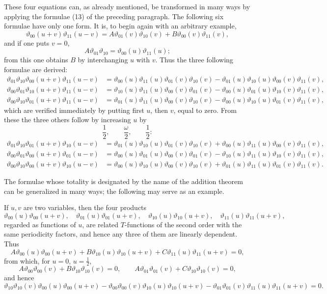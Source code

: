 \documentclass[11pt]{article}
\newcommand{\tht}{\vartheta}
\begin{document}
These four equations can, as already mentioned, be transformed in many ways by applying the formulae (13) of the preceding paragraph. The following six formulae have only one form. It is, to begin again with an arbitrary example,
\[
\tht_{00}(u+v)\tht_{11}(u-v)=A\tht_{01}(v)\tht_{10}(v)+B\tht_{00}(v)\tht_{11}(v),
\]
and if one puts $v=0$,
\[
A\tht_{01}\tht_{10}=\tht_{00}(u)\tht_{11}(u);
\]
from this one obtains $B$ by interchanging $u$ with $v$. Thus the three following formulae are derived:
\begin{align}
\tht_{01}\tht_{10}\tht_{00}(u+v)\tht_{11}(u-v)
&=\tht_{00}(u)\tht_{11}(u)\tht_{01}(v)\tht_{10}(v)
 -\tht_{01}(u)\tht_{10}(u)\tht_{00}(v)\tht_{11}(v), \tag{5}\\
\tht_{00}\tht_{01}\tht_{10}(u+v)\tht_{11}(u-v)
&=\tht_{10}(u)\tht_{11}(u)\tht_{00}(v)\tht_{01}(v)
 -\tht_{00}(u)\tht_{01}(u)\tht_{10}(v)\tht_{11}(v), \tag{6}\\
\tht_{00}\tht_{10}\tht_{01}(u+v)\tht_{11}(u-v)
&=\tht_{01}(u)\tht_{11}(u)\tht_{00}(v)\tht_{10}(v)
 -\tht_{00}(u)\tht_{10}(u)\tht_{01}(v)\tht_{11}(v), \tag{7}
\end{align}
which are verified immediately by putting first $u$, then $v$, equal to zero. From these the three others follow by increasing $u$ by
\[
\frac12,\qquad \frac{\omega}{2},\qquad \frac12:
\]
\begin{align}
\tht_{01}\tht_{10}\tht_{01}(u+v)\tht_{10}(u-v)
&=\tht_{01}(u)\tht_{10}(u)\tht_{01}(v)\tht_{10}(v)
 +\tht_{00}(u)\tht_{11}(u)\tht_{00}(v)\tht_{11}(v), \tag{8}\\
\tht_{00}\tht_{01}\tht_{00}(u+v)\tht_{01}(u-v)
&=\tht_{00}(u)\tht_{01}(u)\tht_{00}(v)\tht_{01}(v)
 -\tht_{10}(u)\tht_{11}(u)\tht_{10}(v)\tht_{11}(v), \tag{9}\\
\tht_{00}\tht_{10}\tht_{00}(u+v)\tht_{10}(u-v)
&=\tht_{00}(u)\tht_{10}(u)\tht_{00}(v)\tht_{10}(v)
 +\tht_{01}(u)\tht_{11}(u)\tht_{01}(v)\tht_{11}(v). \tag{10}
\end{align}

The formulae whose totality is designated by the name of the addition theorem can be generalized in many ways; the following may serve as an example.

If $u,v$ are two variables, then the four products
\[
\tht_{00}(u)\tht_{00}(u+v),\quad
\tht_{01}(u)\tht_{01}(u+v),\quad
\tht_{10}(u)\tht_{10}(u+v),\quad
\tht_{11}(u)\tht_{11}(u+v),
\]
regarded as functions of $u$, are related $T$-functions of the second order with the same periodicity factors, and hence any three of them are linearly dependent. Thus
\[
A\tht_{00}(u)\tht_{00}(u+v)+B\tht_{10}(u)\tht_{10}(u+v)+C\tht_{11}(u)\tht_{11}(u+v)=0,
\]
from which, for $u=0$, $u=\frac12$,
\[
A\tht_{00}\tht_{00}(v)+B\tht_{10}\tht_{10}(v)=0,
\qquad
A\tht_{01}\tht_{01}(v)+C\tht_{10}\tht_{10}(v)=0,
\]
and hence
\begin{equation}
\tht_{10}\tht_{10}(v)\tht_{00}(u)\tht_{00}(u+v)
-\tht_{00}\tht_{00}(v)\tht_{10}(u)\tht_{10}(u+v)
-\tht_{01}\tht_{01}(v)\tht_{11}(u)\tht_{11}(u+v)=0.
\tag{11}
\end{equation}
\end{document}
